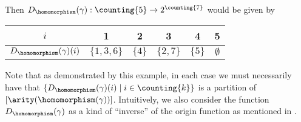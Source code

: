 Then $D_{\homomorphism}(\gamma) : \counting{5} \to 2^{\counting{7}}$ would be given by

\begin{tabular}{|c||c|c|c|c|c|}
    \hline
    $i$ & 1 & 2 & 3 & 4 & 5 \\\hline
    $D_{\homomorphism}(\gamma)(i)$ & $\{1, 3, 6\}$ & $\{4\}$ & $\{2, 7\}$ & $\{5\}$ & $\emptyset$ \\\hline
\end{tabular}

Note that as demonstrated by this example, in each case we must necessarily have that $\{D_{\homomorphism}(\gamma)(i) \mid i \in \counting{k}\}$ is a partition of $[\arity(\homomorphism(\gamma))]$. Intuitively, we also consider the function $D_{\homomorphism}(\gamma)$ as a kind of ``inverse'' of the origin function as mentioned in \cite{BojanOrigin14}.


